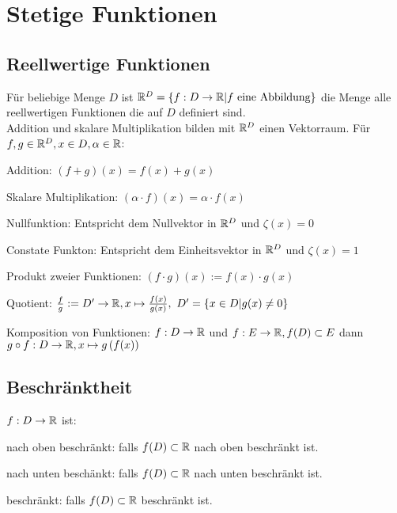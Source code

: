 
\section{Stetige Funktionen}
\subsection{Reellwertige Funktionen}
Für beliebige Menge $D$ ist $\mathbb{R}^D = \{f : D \to \mathbb{R} | f \text{ eine Abbildung}\}$ die Menge alle reellwertigen Funktionen die auf $D$ definiert sind.\\
Addition und skalare Multiplikation bilden mit $\mathbb{R}^D$ einen Vektorraum. Für $f, g \in \mathbb{R}^D, x \in D, \alpha \in \mathbb{R}$:
\begin{compactdesc}
    \item[Addition:] $(f + g)(x) = f(x) + g(x)$
    \item[Skalare Multiplikation:] $\left( \alpha \cdot f \right) (x) = \alpha \cdot f(x)$
    \item[Nullfunktion:] Entspricht dem Nullvektor in $\mathbb{R}^D$ und $\zeta(x) = 0$
    \item[Constate Funkton:]  Entspricht dem Einheitsvektor in $\mathbb{R}^D$ und $\zeta(x) = 1$
    \item[Produkt zweier Funktionen:] $(f \cdot g)(x) := f(x) \cdot g(x)$
    \item[Quotient:] $\frac{f}{g} := D' \to \mathbb{R}, x \mapsto \frac{f(x)}{g(x)}, \ D'= \{x \in D | g(x) \neq 0\} $
    \item[Komposition von Funktionen:] $f: D \to \mathbb{R}$ und $f: E \to \mathbb{R}, f(D) \subset E$ dann $g \circ f: D \to \mathbb{R}, x \mapsto g\left( f(x) \right)$
\end{compactdesc}

\subsection{Beschränktheit}
$f : D \to \mathbb{R}$ ist:
\begin{compactdesc}
    \item[nach oben beschränkt:] falls $f(D) \subset \mathbb{R}$ nach oben beschränkt ist.
    \item[nach unten beschänkt:] falls $f(D) \subset \mathbb{R}$ nach unten beschränkt ist.
    \item[beschränkt:] falls $f(D) \subset \mathbb{R}$ beschränkt ist.
\end{compactdesc}

